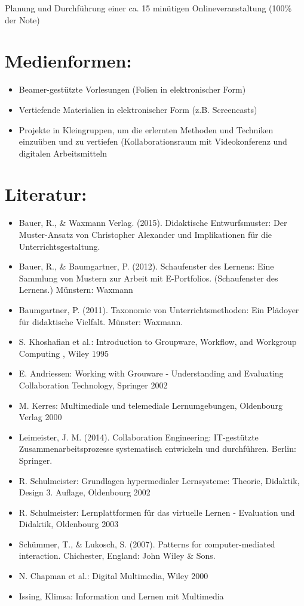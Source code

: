 Planung und Durchführung einer ca. 15 minütigen Onlineveranstaltung
(100\% der Note)

\section*{Medienformen:}\label{medienformen-13}

\begin{itemize}
\tightlist
\item
  Beamer-gestützte Vorlesungen (Folien in elektronischer Form)
\item
  Vertiefende Materialien in elektronischer Form (z.B. Screencasts)
\item
  Projekte in Kleingruppen, um die erlernten Methoden und Techniken
  einzuüben und zu vertiefen (Kollaborationsraum mit Videokonferenz und
  digitalen Arbeitsmitteln
\end{itemize}

\section*{Literatur:}\label{literatur-13}

\begin{itemize}
\tightlist
\item
  Bauer, R., \& Waxmann Verlag. (2015). Didaktische Entwurfsmuster: Der
  Muster-Ansatz von Christopher Alexander und Implikationen für die
  Unterrichtsgestaltung.
\item
  Bauer, R., \& Baumgartner, P. (2012). Schaufenster des Lernens: Eine
  Sammlung von Mustern zur Arbeit mit E-Portfolios. (Schaufenster des
  Lernens.) Münstern: Waxmann
\item
  Baumgartner, P. (2011). Taxonomie von Unterrichtsmethoden: Ein
  Plädoyer für didaktische Vielfalt. Münster: Waxmann.
\item
  S. Khoshafian et al.: Introduction to Groupware, Workflow, and
  Workgroup Computing , Wiley 1995
\item
  E. Andriessen: Working with Grouware - Understanding and Evaluating
  Collaboration Technology, Springer 2002
\item
  M. Kerres: Multimediale und telemediale Lernumgebungen, Oldenbourg
  Verlag 2000
\item
  Leimeister, J. M. (2014). Collaboration Engineering: IT-gestützte
  Zusammenarbeitsprozesse systematisch entwickeln und durchführen.
  Berlin: Springer.
\item
  R. Schulmeister: Grundlagen hypermedialer Lernsysteme: Theorie,
  Didaktik, Design 3. Auflage, Oldenbourg 2002
\item
  R. Schulmeister: Lernplattformen für das virtuelle Lernen - Evaluation
  und Didaktik, Oldenbourg 2003
\item
  Schümmer, T., \& Lukosch, S. (2007). Patterns for computer-mediated
  interaction. Chichester, England: John Wiley \& Sons.
\item
  N. Chapman et al.: Digital Multimedia, Wiley 2000
\item
  Issing, Klimsa: Information und Lernen mit Multimedia
\end{itemize}

